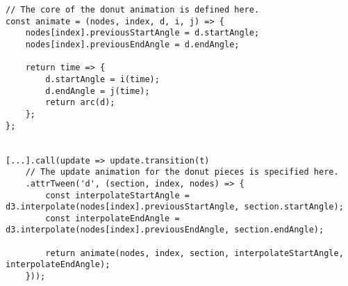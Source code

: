 \begin{minipage}{0.9\linewidth}
    \begin{lstlisting}[style=htmlCSSjs, captionpos=b, caption={The implementation of the arc update animations. As the core of the animation donut sections is used by the enter and the update behavior, it is defined first. The new values for start and end angle are stored on the node itself. This needs to be done to be able to reference these values again for the next update, as the previous angles will not be accessible through the pie object after regenerating it for an update. Finally the function which is called for each frame of the animation is defined and returned. This function first interpolates the start and end angle values using the passed interpolation functions and the time of time which has already pased in the animation. This time value is in the range of zero to one, depending on how far along the animation is. These newly interpolated angles define the start and end angle of the pie piece, which is then turned into a path element by calling the \texttt{arc} function for this pie piece. As the interpolate functions \texttt{interpolateStartAngle} and \texttt{interpolateEndAngle} differ for the enter and update behavior, they are defined in the respective sections. They are passed into the core \texttt{animate} function. (Section from \ref{app:donut-chart} lines 136ff)}, label={lst:donut-chart}]
// The core of the donut animation is defined here.
const animate = (nodes, index, d, i, j) => {
    nodes[index].previousStartAngle = d.startAngle;
    nodes[index].previousEndAngle = d.endAngle;
    
    return time => {
        d.startAngle = i(time);
        d.endAngle = j(time);
        return arc(d);
    };
};


[...].call(update => update.transition(t)
    // The update animation for the donut pieces is specified here.
    .attrTween('d', (section, index, nodes) => {
        const interpolateStartAngle = d3.interpolate(nodes[index].previousStartAngle, section.startAngle);
        const interpolateEndAngle = d3.interpolate(nodes[index].previousEndAngle, section.endAngle);

        return animate(nodes, index, section, interpolateStartAngle, interpolateEndAngle);
    }));
    \end{lstlisting}
\end{minipage}


